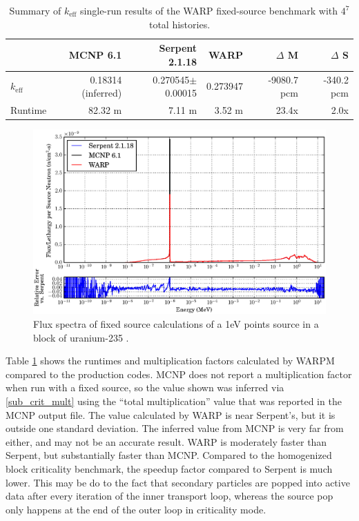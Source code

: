 \begin{table}[h]
\centering
\caption{Summary of $k_\mathrm{eff}$ single-run results of the WARP fixed-source benchmark with $4^7$ total histories.}
\label{fixed_summary}
\begin{tabular}{| l | r | r | r | r | r |}
 \hline
 & MCNP 6.1 & Serpent 2.1.18 & WARP & $\Delta$ M & $\Delta$ S  \\
\hline
\hline
 $k_\mathrm{eff}$ & 0.18314 (inferred) & 0.270545$\pm$0.00015 & 0.273947 & -9080.7 pcm & -340.2 pcm   \\
 \hline
 Runtime               & 82.32 m & 7.11 m &  3.52 m & 23.4x  & 2.0x  \\
 \hline
\end{tabular}
\end{table}

\begin{figure}[h!]
\centering
\includegraphics[width=\textwidth,trim= 1cm 0cm 1cm 0cm]{graphics/finalresults/fixed_spec.eps}
\caption{Flux spectra of fixed source calculations of a 1eV points source in a block of uranium-235 . \label{fixed_spec} }
\end{figure}

Table \ref{fixed_summary} shows the runtimes and multiplication factors calculated by WARPM compared to the production codes.  MCNP does not report a multiplication factor when run with a fixed source, so the value shown was inferred via \eqref{sub_crit_mult} using the ``total multiplication'' value that was reported in the MCNP output file.  The value calculated by WARP is near Serpent's, but it is outside one standard deviation.  The inferred value from MCNP is very far from either, and may not be an accurate result.  WARP is moderately faster than Serpent, but substantially faster than MCNP.  Compared to the homogenized block criticality benchmark, the speedup factor compared to Serpent is much lower.  This may be do to the fact that secondary particles are popped into active data after every iteration of the inner transport loop, whereas the source pop only happens at the end of the outer loop in criticality mode.

